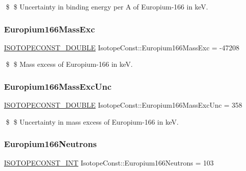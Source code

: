 \$ \$ Uncertainty in binding energy per A of Europium-\/166 in keV. \mbox{\label{group___isotope_const-_europium-_eu166_ga8dd15ad5c2452ce487c3b998968c908a}} 
\subsubsection{\texorpdfstring{Europium166\+Mass\+Exc}{Europium166MassExc}}
{\footnotesize\ttfamily \mbox{\hyperlink{group___isotope_const-_macros_ga8f45a7272ce02c0b4c65c44636ed719a}{I\+S\+O\+T\+O\+P\+E\+C\+O\+N\+S\+T\+\_\+\+D\+O\+U\+B\+LE}} Isotope\+Const\+::\+Europium166\+Mass\+Exc = -\/47208}

\$ \$ Mass excess of Europium-\/166 in keV. \mbox{\label{group___isotope_const-_europium-_eu166_ga7a8f1ad98cf71ef014d55a2a4693d4fd}} 
\subsubsection{\texorpdfstring{Europium166\+Mass\+Exc\+Unc}{Europium166MassExcUnc}}
{\footnotesize\ttfamily \mbox{\hyperlink{group___isotope_const-_macros_ga8f45a7272ce02c0b4c65c44636ed719a}{I\+S\+O\+T\+O\+P\+E\+C\+O\+N\+S\+T\+\_\+\+D\+O\+U\+B\+LE}} Isotope\+Const\+::\+Europium166\+Mass\+Exc\+Unc = 358}

\$ \$ Uncertainty in mass excess of Europium-\/166 in keV. \mbox{\label{group___isotope_const-_europium-_eu166_gaed1286c3ca7a8992a8013d0ef3fc6400}} 
\subsubsection{\texorpdfstring{Europium166\+Neutrons}{Europium166Neutrons}}
{\footnotesize\ttfamily \mbox{\hyperlink{group___isotope_const-_macros_ga5f18360b3e99483a35c32d789e62621c}{I\+S\+O\+T\+O\+P\+E\+C\+O\+N\+S\+T\+\_\+\+I\+NT}} Isotope\+Const\+::\+Europium166\+Neutrons = 103}

